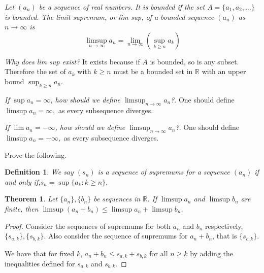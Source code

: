 \documentclass[letter]{article}
\newtheorem{theorem}{Theorem}
\newtheorem{definition}{Definition}
\newenvironment{menumerate}{%
  \edef\backupindent{\the\parindent}%
  \enumerate%
  \setlength{\parindent}{\backupindent}%
}{\endenumerate}
\begin{document}
\begin{menumerate}
			\setcounter{enumi}{44}
				\item \textit{Let $(a_n)$ be a sequence of real numbers. It is bounded if the set $A = \{a_1, a_2, \dots \}$ is bounded. The limit supremum, or lim sup, of a bounded sequence $(a_n)$ as $n\to\infty$ is}
				$$\limsup_{n\to\infty }a_n = \lim_{n\to\infty}\left(\sup_{k\geq n} a_k\right)$$
				\begin{menumerate}
				\item \textit{Why does lim sup exist?} It exists because if $A$ is bounded, so is any subset. Therefore the set of $a_k$ with $k\geq n$ must be a bounded set in $\mathbb{R}$ with an upper bound $\sup_{k\geq n}{a_n}.$
				\item \textit{If $\sup{a_n} = \infty$, how should we define $\limsup_{n\to\infty}a_n$?}. One should define $\limsup a_n = \infty,$ as every subsequence diverges.
				\item \textit{If $\lim a_n = -\infty$, how should we define $\limsup_{n\to\infty}a_n$?}. One should define $\limsup a_n = -\infty,$ as every subsequence diverges.

			\item Prove the following.

				\begin{definition} We say $(s_{n})$ is a sequence of supremums for a sequence $(a_n)$ if and only if,$ s_n = \sup\{a_k : k \geq n\}.$
	 			\end{definition}
				\begin{theorem}
			    Let $\{a_n\}, \{b_n\}$ be sequences in $\mathbb{R}$. If $\limsup a_n$ and $\limsup b_n$ are finite, 
			    then $\limsup\left(a_n + b_n\right) \leq \limsup a_n + \limsup b_n$.
			    \end{theorem}
			    
			    \begin{proof}
			    Consider the sequences of supremums for both $a_n$ and $b_n$ respectively, $\{s_{a,k}\}, \{s_{b,k}\}$.
			    Also consider the sequence of supremums for $a_n + b_n$, that is $\{s_{c,k}\}$.
			    
			    
			    We have that for fixed $k$, $a_n + b_n \leq s_{a,k} +  s_{b,k}$ for all $n \geq k$ 
			    by adding the inequalities defined for $s_{a,k}$ and $s_{b,k}$.
			    

\end{proof}
\end{menumerate}
\end{menumerate}
\end{document}
